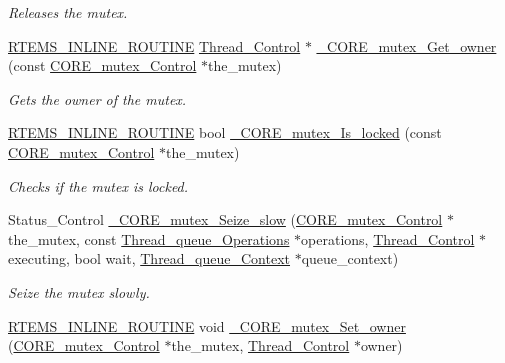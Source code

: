 \begin{DoxyCompactItemize}
\begin{DoxyCompactList}\small\item\em Releases the mutex. \end{DoxyCompactList}\item 
\mbox{\hyperlink{group__RTEMSScoreBaseDefs_gac216239df231d5dbd15e3520b0b9313f}{R\+T\+E\+M\+S\+\_\+\+I\+N\+L\+I\+N\+E\+\_\+\+R\+O\+U\+T\+I\+NE}} \mbox{\hyperlink{struct__Thread__Control}{Thread\+\_\+\+Control}} $\ast$ \mbox{\hyperlink{group__RTEMSScoreMutex_gac97696832bb6ad43d333541536040ec3}{\+\_\+\+C\+O\+R\+E\+\_\+mutex\+\_\+\+Get\+\_\+owner}} (const \mbox{\hyperlink{structCORE__mutex__Control}{C\+O\+R\+E\+\_\+mutex\+\_\+\+Control}} $\ast$the\+\_\+mutex)
\begin{DoxyCompactList}\small\item\em Gets the owner of the mutex. \end{DoxyCompactList}\item 
\mbox{\hyperlink{group__RTEMSScoreBaseDefs_gac216239df231d5dbd15e3520b0b9313f}{R\+T\+E\+M\+S\+\_\+\+I\+N\+L\+I\+N\+E\+\_\+\+R\+O\+U\+T\+I\+NE}} bool \mbox{\hyperlink{group__RTEMSScoreMutex_ga1e56fcf89e62b1f78bd7453ad6ee95fc}{\+\_\+\+C\+O\+R\+E\+\_\+mutex\+\_\+\+Is\+\_\+locked}} (const \mbox{\hyperlink{structCORE__mutex__Control}{C\+O\+R\+E\+\_\+mutex\+\_\+\+Control}} $\ast$the\+\_\+mutex)
\begin{DoxyCompactList}\small\item\em Checks if the mutex is locked. \end{DoxyCompactList}\item 
Status\+\_\+\+Control \mbox{\hyperlink{group__RTEMSScoreMutex_ga89693ae813a53c8984a6e40c6c228322}{\+\_\+\+C\+O\+R\+E\+\_\+mutex\+\_\+\+Seize\+\_\+slow}} (\mbox{\hyperlink{structCORE__mutex__Control}{C\+O\+R\+E\+\_\+mutex\+\_\+\+Control}} $\ast$the\+\_\+mutex, const \mbox{\hyperlink{structThread__queue__Operations}{Thread\+\_\+queue\+\_\+\+Operations}} $\ast$operations, \mbox{\hyperlink{struct__Thread__Control}{Thread\+\_\+\+Control}} $\ast$executing, bool wait, \mbox{\hyperlink{structThread__queue__Context}{Thread\+\_\+queue\+\_\+\+Context}} $\ast$queue\+\_\+context)
\begin{DoxyCompactList}\small\item\em Seize the mutex slowly. \end{DoxyCompactList}\item 
\mbox{\hyperlink{group__RTEMSScoreBaseDefs_gac216239df231d5dbd15e3520b0b9313f}{R\+T\+E\+M\+S\+\_\+\+I\+N\+L\+I\+N\+E\+\_\+\+R\+O\+U\+T\+I\+NE}} void \mbox{\hyperlink{group__RTEMSScoreMutex_gaf6d95e3bb9f3ebb168fa67f3731740dc}{\+\_\+\+C\+O\+R\+E\+\_\+mutex\+\_\+\+Set\+\_\+owner}} (\mbox{\hyperlink{structCORE__mutex__Control}{C\+O\+R\+E\+\_\+mutex\+\_\+\+Control}} $\ast$the\+\_\+mutex, \mbox{\hyperlink{struct__Thread__Control}{Thread\+\_\+\+Control}} $\ast$owner)

\end{DoxyCompactItemize}
